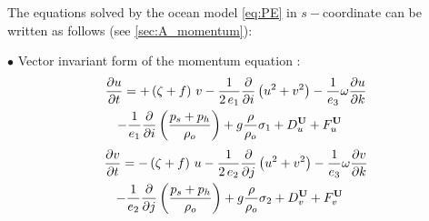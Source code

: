 \documentclass[../main/NEMO_manual]{subfiles}
\begin{document}
The equations solved by the ocean model \autoref{eq:PE} in $s-$coordinate can be written as follows
(see \autoref{sec:A_momentum}):

 \vspace{0.5cm}
$\bullet$ Vector invariant form of the momentum equation :
\begin{multline*}
  \frac{\partial  u   }{\partial t}=
  +   \left( {\zeta +f} \right)\,v
  -   \frac{1}{2\,e_1} \frac{\partial}{\partial i} \left(  u^2+v^2   \right)
  -   \frac{1}{e_3} \omega \frac{\partial u}{\partial k}       \\
  -   \frac{1}{e_1} \frac{\partial}{\partial i} \left( \frac{p_s + p_h}{\rho_o}    \right)
  +  g\frac{\rho }{\rho_o}\sigma_1
  +   D_u^{\mathbf{U}}  +   F_u^{\mathbf{U}} \quad
\end{multline*}
\begin{multline*}
  \frac{\partial v }{\partial t}=
  -   \left( {\zeta +f} \right)\,u
  -   \frac{1}{2\,e_2 }\frac{\partial }{\partial j}\left(  u^2+v^2  \right)
  -   \frac{1}{e_3 } \omega \frac{\partial v}{\partial k}         \\
  -   \frac{1}{e_2 }\frac{\partial }{\partial j}\left( \frac{p_s+p_h }{\rho_o}  \right)
  +  g\frac{\rho }{\rho_o }\sigma_2
  +  D_v^{\mathbf{U}}  +   F_v^{\mathbf{U}} \quad
\end{multline*}
\end{document}

